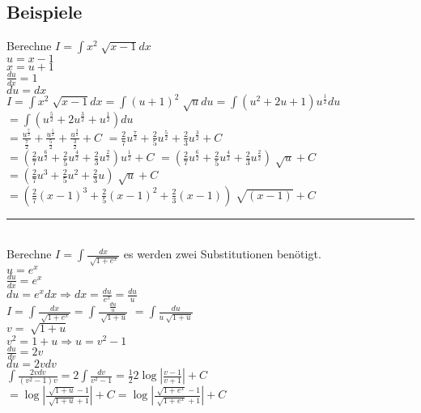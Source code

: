 \documentclass[../main.tex]{subfiles}
\begin{document}
\subsection{Beispiele}
Berechne $I = \int x^2 \sqrt[]{x-1}dx$ \\
$u = x-1$ \\
$x = u + 1$ \\
$\frac{du}{dx} = 1$ \\
$du = dx$ \\ [7pt]
$I = \int x^2 \sqrt[]{x-1}dx = \int (u+1)^2 \sqrt[]{u} du = \int (u^2 + 2u +1)u^{\frac{1}{2}}du$
$ = \int (u^{\frac{5}{2}} + 2u^{\frac{3}{2}} + u^{\frac{1}{2}})du$ \\ [7pt]
$ = \frac{u^{\frac{7}{2}}}{\frac{7}{2}} + \frac{u^{\frac{5}{2}}}{\frac{5}{2}} +\frac{u^{\frac{3}{2}}}{\frac{3}{2}} + C$ 
$ = \frac{2}{7}u^{\frac{7}{2}} + \frac{2}{5}u^{\frac{5}{2}} + \frac{2}{3}u^{\frac{3}{2}} + C$ \\ [7pt]
$ = (\frac{2}{7}u^{\frac{6}{2}} + \frac{2}{5}u^{\frac{4}{2}} + \frac{2}{3}u^{\frac{2}{2}})u^{\frac{1}{2}} + C$
$ = (\frac{2}{7}u^{\frac{6}{2}} + \frac{2}{5}u^{\frac{4}{2}} + \frac{2}{3}u^{\frac{2}{2}})\sqrt[]{u} + C$
$ = (\frac{2}{7}u^3 + \frac{2}{5}u^2 + \frac{2}{3}u)\sqrt[]{u} + C$ \\ [7pt]
$ = (\frac{2}{7}(x-1)^3 + \frac{2}{5}(x-1)^2 + \frac{2}{3}(x-1))\sqrt[]{(x-1)} + C$ \\ [14pt]
\noindent\rule{8cm}{0.4pt} \\
Berechne $I = \int \frac{dx}{\sqrt[]{1+e^x}}$ es werden zwei Substitutionen benötigt. \\ [7pt]
$ u = e^x$ \\
$ \frac{du}{dx}= e^x$ \\
$ du = e^xdx \Longrightarrow dx = \frac{du}{e^x} = \frac{du}{u}$ \\
$I = \int \frac{dx}{\sqrt[]{1+e^x}} = \int \frac{\frac{du}{u}}{\sqrt[]{1+u}}$
$ = \int \frac{du}{u\sqrt[]{1+u}}$ \\ [7pt]
$v = \sqrt[]{1+u}$ \\
$ v^2 = 1+u \Longrightarrow u = v^2-1$ \\
$ \frac{du}{dv} = 2v$ \\
$ du = 2vdv$ \\ [7pt]
$\int \frac{2vdv}{(v^2-1)v} = 2 \int \frac{dv}{v^2-1} = \frac{1}{2}2\log | \frac{v-1}{v+1} | + C$
$ = \log | \frac{\sqrt[]{1+u}-1}{\sqrt[]{1+u}+1}| + C = \log | \frac{\sqrt[]{1+e^x}-1}{\sqrt[]{1+e^x}+1}| + C$
\end{document}
